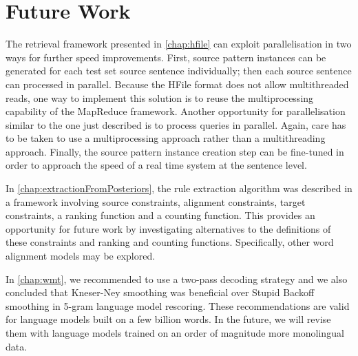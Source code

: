 \section{Future Work}
\label{sec:thesisFutureWork}


The retrieval framework presented in \autoref{chap:hfile}
can exploit parallelisation in two ways for further
speed improvements. First, source pattern instances
can be generated for each test set source sentence individually; then
each source sentence can processed in parallel. Because
the HFile format does not allow multithreaded reads, %
one way to implement this solution is to reuse the multiprocessing
capability of the MapReduce framework.
Another opportunity for parallelisation similar to the one just described
is to process queries in parallel. Again, care has to be taken to use
a multiprocessing approach rather than a multithreading approach.
Finally, the source pattern instance creation step can be fine-tuned
in order to approach the speed of a real time system at the sentence
level.


In \autoref{chap:extractionFromPosteriors}, the rule extraction
algorithm was described in a framework involving
source constraints, alignment constraints, target constraints, a ranking
function and a counting function. This provides an opportunity
for future work by investigating alternatives to the definitions
of these constraints and ranking and counting functions.
Specifically, other word alignment models may be explored.


In \autoref{chap:wmt}, we recommended to use a two-pass
decoding strategy and we also concluded that Kneser-Ney
smoothing was beneficial over Stupid Backoff smoothing
in 5-gram language model rescoring. These recommendations
are valid for language models built on a few billion words.
In the future, we will revise them with language models
trained on an order of magnitude more monolingual data.


